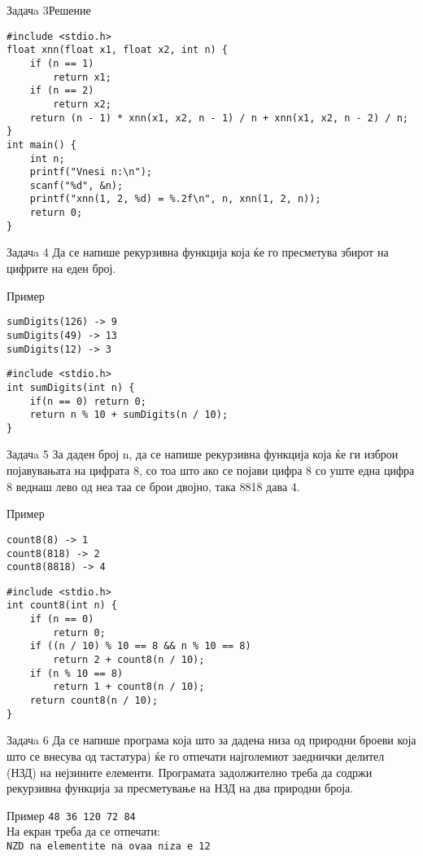 \begin{frame}[fragile]{Задачa 3}{Решение}
\begin{lstlisting}
#include <stdio.h>
float xnn(float x1, float x2, int n) {
    if (n == 1)
        return x1;
    if (n == 2)
        return x2;
    return (n - 1) * xnn(x1, x2, n - 1) / n + xnn(x1, x2, n - 2) / n;
}
int main() {
    int n;
    printf("Vnesi n:\n");
    scanf("%d", &n);
    printf("xnn(1, 2, %d) = %.2f\n", n, xnn(1, 2, n));
    return 0;
}
\end{lstlisting}
\end{frame}


\begin{frame}[fragile]{Задачa 4}
Да се напише рекурзивна функција која ќе го пресметува збирот на цифрите на еден
број.
\begin{exampleblock}{Пример}
\begin{verbatim}
sumDigits(126) -> 9
sumDigits(49) -> 13
sumDigits(12) -> 3
\end{verbatim}
\end{exampleblock}
\pause
\begin{lstlisting}
#include <stdio.h>
int sumDigits(int n) {
    if(n == 0) return 0;
    return n % 10 + sumDigits(n / 10);
}
\end{lstlisting}
\end{frame}

\begin{frame}[fragile]{Задачa 5}
За даден број n, да се напише рекурзивна функција која ќе ги изброи појавувањата
на цифрата 8, со тоа што ако се појави цифра 8 со уште една цифра 8 веднаш лево
од неа таа се брои двојно, така 8818 дава 4.
\begin{exampleblock}{Пример}
\begin{verbatim}
count8(8) -> 1
count8(818) -> 2
count8(8818) -> 4
\end{verbatim}
\end{exampleblock}
\pause
\begin{lstlisting}
#include <stdio.h>
int count8(int n) {
    if (n == 0)
        return 0;
    if ((n / 10) % 10 == 8 && n % 10 == 8)
        return 2 + count8(n / 10);
    if (n % 10 == 8)
        return 1 + count8(n / 10);
    return count8(n / 10);
}
\end{lstlisting}
\end{frame}


\begin{frame}{Задачa 6}
Да се напише програма која што за дадена низа од природни броеви  која што се
внесува од тастатура) ќе го отпечати најголемиот заеднички делител (НЗД) на
нејзините елементи.  Програмата задолжително треба да содржи рекурзивна функција
за пресметување на НЗД на два природни броја.
\begin{exampleblock}{Пример}
\texttt{48 36 120 72 84}\\
На екран треба да се отпечати:\\
\texttt{NZD na elementite na ovaa niza e 12}
\end{exampleblock}
\end{frame}


